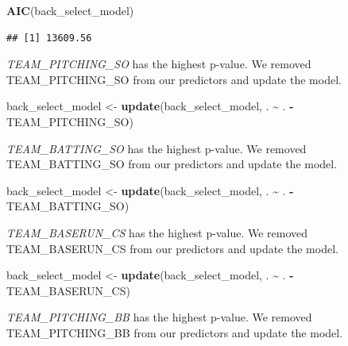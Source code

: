 \documentclass[
]{article}
\newenvironment{Shaded}{\begin{snugshade}}{\end{snugshade}}
\newcommand{\FunctionTok}[1]{\textcolor[rgb]{0.13,0.29,0.53}{\textbf{#1}}}
\newcommand{\NormalTok}[1]{#1}
\newcommand{\OtherTok}[1]{\textcolor[rgb]{0.56,0.35,0.01}{#1}}
\newcommand{\SpecialCharTok}[1]{\textcolor[rgb]{0.81,0.36,0.00}{\textbf{#1}}}
\begin{document}
\begin{Shaded}
\begin{Highlighting}[]
\FunctionTok{AIC}\NormalTok{(back\_select\_model)}
\end{Highlighting}
\end{Shaded}

\begin{verbatim}
## [1] 13609.56
\end{verbatim}

\emph{TEAM\_PITCHING\_SO} has the highest p-value. We removed
TEAM\_PITCHING\_SO from our predictors and update the model.

\begin{Shaded}
\begin{Highlighting}[]
\NormalTok{back\_select\_model }\OtherTok{\textless{}{-}} \FunctionTok{update}\NormalTok{(back\_select\_model, . }\SpecialCharTok{\textasciitilde{}}\NormalTok{ . }\SpecialCharTok{{-}}\NormalTok{ TEAM\_PITCHING\_SO)}
\end{Highlighting}
\end{Shaded}

\emph{TEAM\_BATTING\_SO} has the highest p-value. We removed
TEAM\_BATTING\_SO from our predictors and update the model.

\begin{Shaded}
\begin{Highlighting}[]
\NormalTok{back\_select\_model }\OtherTok{\textless{}{-}} \FunctionTok{update}\NormalTok{(back\_select\_model, . }\SpecialCharTok{\textasciitilde{}}\NormalTok{ . }\SpecialCharTok{{-}}\NormalTok{ TEAM\_BATTING\_SO)}
\end{Highlighting}
\end{Shaded}

\emph{TEAM\_BASERUN\_CS} has the highest p-value. We removed
TEAM\_BASERUN\_CS from our predictors and update the model.

\begin{Shaded}
\begin{Highlighting}[]
\NormalTok{back\_select\_model }\OtherTok{\textless{}{-}} \FunctionTok{update}\NormalTok{(back\_select\_model, . }\SpecialCharTok{\textasciitilde{}}\NormalTok{ . }\SpecialCharTok{{-}}\NormalTok{ TEAM\_BASERUN\_CS)}
\end{Highlighting}
\end{Shaded}

\emph{TEAM\_PITCHING\_BB} has the highest p-value. We removed
TEAM\_PITCHING\_BB from our predictors and update the model.
\end{document}
